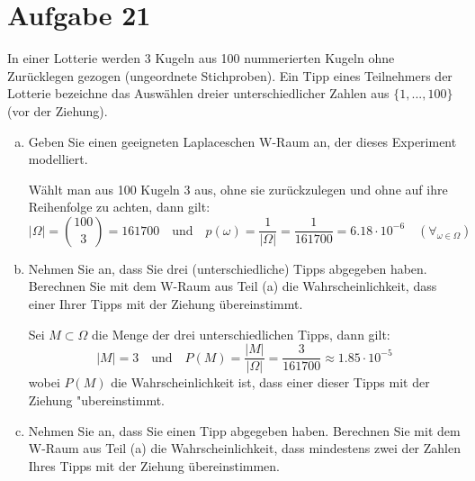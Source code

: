\section{Aufgabe 21}
\setcounter{section}{21}

In einer Lotterie werden 3 Kugeln aus 100 nummerierten Kugeln ohne Zurücklegen
gezogen (ungeordnete Stichproben). Ein Tipp eines Teilnehmers der Lotterie
bezeichne das Auswählen dreier unterschiedlicher Zahlen aus $\{1,...,100\}$
(vor der Ziehung).
\begin{enumerate}[(a)]
    \item Geben Sie einen geeigneten Laplaceschen W-Raum an, der dieses
        Experiment modelliert.

        Wählt man aus 100 Kugeln 3 aus, ohne sie zurückzulegen und ohne auf
        ihre Reihenfolge zu achten, dann gilt:
        \begin{equation*}
            |\Omega| = \binom{100}{3} = 161700 \quad\text{und}\quad p(\omega) = \dfrac{1}{|\Omega|} = \dfrac{1}{161700} = 6.18 \cdot 10^{-6} \quad (\forall_{\omega \in \Omega})
        \end{equation*}

    \item Nehmen Sie an, dass Sie drei (unterschiedliche) Tipps abgegeben haben.
        Berechnen Sie mit dem W-Raum aus Teil (a) die Wahrscheinlichkeit, dass
        einer Ihrer Tipps mit der Ziehung übereinstimmt.

        Sei $M \subset \Omega$ die Menge der drei unterschiedlichen Tipps, dann gilt:
        \begin{equation*}
            |M| = 3 \quad\text{und}\quad P(M) = \dfrac{|M|}{|\Omega|} = \dfrac{3}{161700} \approx 1.85 \cdot 10^{-5}
        \end{equation*}
        wobei $P(M)$ die Wahrscheinlichkeit ist, dass einer dieser Tipps mit der Ziehung "ubereinstimmt.

    \item Nehmen Sie an, dass Sie einen Tipp abgegeben haben. Berechnen Sie mit dem
        W-Raum aus Teil (a) die Wahrscheinlichkeit, dass mindestens zwei der
        Zahlen Ihres Tipps mit der Ziehung übereinstimmen.


\end{enumerate}
